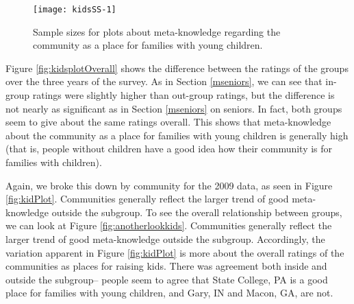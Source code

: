\documentclass[smallextended]{svjour3}\usepackage[]{graphicx}\usepackage[]{color}
\newenvironment{knitrout}{}{} %
\begin{document}
\begin{knitrout}
\color{fgcolor}\begin{figure}

{\centering \texttt{[image: kidsSS-1]} 

}

\caption[Sample sizes for plots about meta-knowledge regarding the community as a place for families with young children]{Sample sizes for plots about meta-knowledge regarding the community as a place for families with young children.}\label{fig:kidsSS}
\end{figure}


\end{knitrout}



Figure \ref{fig:kidsplotOverall} shows the difference between the ratings of the groups over the three years of the survey. As in Section \ref{mseniors}, we can see that in-group ratings were slightly higher than out-group ratings, but the difference is not nearly as significant as in Section \ref{mseniors} on seniors. In fact, both groups seem to give about the same ratings overall. This shows that meta-knowledge about the community as a place for families with young children is generally high (that is, people without children have a good idea how their community is for families with children).

Again, we broke this down by community for the 2009 data, as seen in Figure \ref{fig:kidPlot}. Communities generally reflect the larger trend of good meta-knowledge outside the subgroup. To see the overall relationship between groups, we can look at Figure \ref{fig:anotherlookkids}. Communities generally reflect the larger trend of good meta-knowledge outside the subgroup. Accordingly, the variation apparent in Figure \ref{fig:kidPlot} is more about the overall ratings of the communities as places for raising kids. There was agreement both inside and outside the subgroup-- people seem to agree that State College, PA is a good place for families with young children, and Gary, IN and Macon, GA, are not. 
\end{document}
